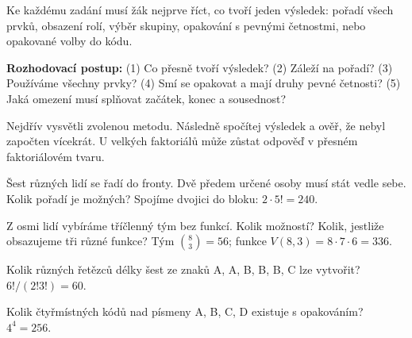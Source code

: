 \documentclass[11pt,a4paper]{article}
\begin{document}

Ke každému zadání musí žák nejprve říct, co tvoří jeden výsledek: pořadí všech prvků, obsazení rolí, výběr skupiny, opakování s pevnými četnostmi, nebo opakované volby do kódu.



\begin{definiceBox}
\textbf{Rozhodovací postup:} (1) Co přesně tvoří výsledek? (2) Záleží na pořadí? (3) Používáme všechny prvky? (4) Smí se opakovat a mají druhy pevné četnosti? (5) Jaká omezení musí splňovat začátek, konec a sousednost?
\end{definiceBox}
Nejdřív vysvětli zvolenou metodu. Následně spočítej výsledek a ověř, že nebyl započten vícekrát. U velkých faktoriálů může zůstat odpověď v přesném faktoriálovém tvaru.


\begin{prikladReseniBox}[title={Příklad 1}]
Šest různých lidí se řadí do fronty. Dvě předem určené osoby musí stát vedle sebe. Kolik pořadí je možných?
\tcblower
Spojíme dvojici do bloku: $2\cdot5!=240$.
\end{prikladReseniBox}



\begin{prikladReseniBox}[title={Příklad 2}]
Z osmi lidí vybíráme tříčlenný tým bez funkcí. Kolik možností? Kolik, jestliže obsazujeme tři různé funkce?
\tcblower
Tým $\binom83=56$; funkce $V(8,3)=8\cdot7\cdot6=336$.
\end{prikladReseniBox}



\begin{prikladReseniBox}[title={Příklad 3}]
Kolik různých řetězců délky šest ze znaků A, A, B, B, B, C lze vytvořit?
\tcblower
$6!/(2!3!)=60$.
\end{prikladReseniBox}



\begin{prikladReseniBox}[title={Příklad 4}]
Kolik čtyřmístných kódů nad písmeny A, B, C, D existuje s opakováním?
\tcblower
$4^4=256$.
\end{prikladReseniBox}



\end{document}
